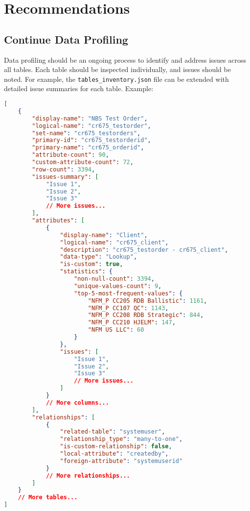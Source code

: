 \section{Recommendations}

\subsection{Continue Data Profiling}
Data profiling should be an ongoing process to identify and address issues across all tables. Each table should be inspected individually, and issues should be noted. For example, the \texttt{tables\_inventory.json} file can be extended with detailed issue summaries for each table. Example:

\begin{lstlisting}[language=json]
[
    {
        "display-name": "NBS Test Order",
        "logical-name": "cr675_testorder",
        "set-name": "cr675_testorders",
        "primary-id": "cr675_testorderid",
        "primary-name": "cr675_orderid",
        "attribute-count": 90,
        "custom-attribute-count": 72,
        "row-count": 3394,
        "issues-summary": [
            "Issue 1",
            "Issue 2",
            "Issue 3"
            // More issues...
        ],
        "attributes": [
            {
                "display-name": "Client",
                "logical-name": "cr675_client",
                "description": "cr675_testorder - cr675_client",
                "data-type": "Lookup",
                "is-custom": true,
                "statistics": {
                    "non-null-count": 3394,
                    "unique-values-count": 9,
                    "top-5-most-frequent-values": {
                        "NFM_P CC205 RDB Ballistic": 1161,
                        "NFM_P CC107 QC": 1143,
                        "NFM_P CC208 RDB Strategic": 844,
                        "NFM_P CC210 HJELM": 147,
                        "NFM US LLC": 60
                    }
                },
                "issues": [
                    "Issue 1",
                    "Issue 2",
                    "Issue 3"
                    // More issues...
                ]
            }
            // More columns... 
        ],
        "relationships": [
            {
                "related-table": "systemuser",
                "relationship_type": "many-to-one",
                "is-custom-relationship": false,
                "local-attribute": "createdby",
                "foreign-attribute": "systemuserid"
            }
            // More relationships...
        ]
    }
    // More tables...
]
\end{lstlisting}

